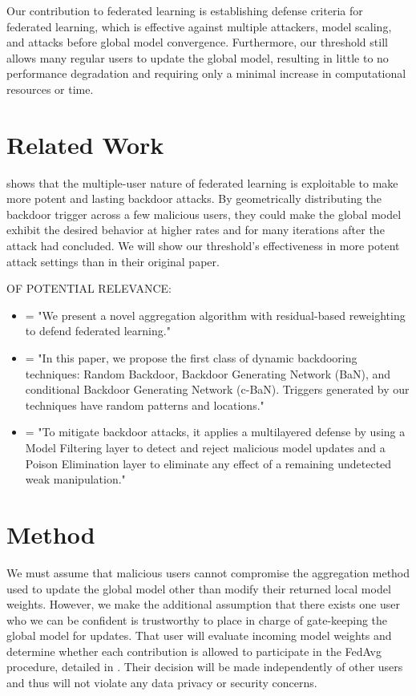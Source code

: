 \documentclass{article} %
\begin{document}
Our contribution to federated learning is establishing defense criteria for federated learning, which is effective against multiple attackers, model scaling, and attacks before global model convergence. Furthermore, our threshold still allows many regular users to update the global model, resulting in little to no performance degradation and requiring only a minimal increase in computational resources or time.

%
\section{Related Work}

\cite{dba} shows that the multiple-user nature of federated learning is exploitable to make more potent and lasting backdoor attacks. By geometrically distributing the backdoor trigger across a few malicious users, they could make the global model exhibit the desired behavior at higher rates and for many iterations after the attack had concluded. We will show our threshold's effectiveness in more potent attack settings than in their original paper.

OF POTENTIAL RELEVANCE:
\begin{itemize}
    \item \cite{resid_wt} = "We present a novel aggregation algorithm with residual-based reweighting to defend federated learning."
    \item \cite{dynamic} = "In this paper, we propose the first class of dynamic backdooring techniques: Random Backdoor, Backdoor Generating Network (BaN), and conditional Backdoor Generating Network (c-BaN). Triggers generated by our techniques have random patterns and locations."
    \item \cite{baffle} = "To mitigate backdoor attacks, it applies a multilayered defense by using a Model Filtering layer to detect and reject malicious model updates and a Poison Elimination layer to eliminate any effect of a remaining undetected weak manipulation."
\end{itemize}

%
\section{Method}

We must assume that malicious users cannot compromise the aggregation method used to update the global model other than modify their returned local model weights. However, we make the additional assumption that there exists one user who we can be confident is trustworthy to place in charge of gate-keeping the global model for updates. That user will evaluate incoming model weights and determine whether each contribution is allowed to participate in the FedAvg procedure, detailed in \cite{fedavg}. Their decision will be made independently of other users and thus will not violate any data privacy or security concerns.
\end{document}
